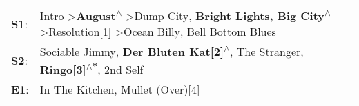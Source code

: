 \begin{supertabular}{p{0.03\textwidth}p{0.92\textwidth}}
 \textbf{S1}:  &  Intro\textsuperscript{} \textgreater \enspace \textbf{August\textsuperscript{$\wedge$}} \textgreater \enspace Dump City\textsuperscript{}, \enspace \textbf{Bright Lights, Big City\textsuperscript{$\wedge$}} \textgreater \enspace Resolution[1]\textsuperscript{} \textgreater \enspace Ocean Billy\textsuperscript{}, \enspace Bell Bottom Blues\textsuperscript{}  \enspace  \\
 \textbf{S2}:  &                                                                                                                                    Sociable Jimmy\textsuperscript{}, \enspace \textbf{Der Bluten Kat[2]\textsuperscript{$\wedge$}}, \enspace The Stranger\textsuperscript{}, \enspace \textbf{Ringo[3]\textsuperscript{$\wedge$*}}, \enspace 2nd Self\textsuperscript{}  \enspace  \\
 \textbf{E1}:  &                                                                                                                                                                                                                                                                                           In The Kitchen\textsuperscript{}, \enspace Mullet (Over)[4]\textsuperscript{}  \enspace  \\
\end{supertabular}
